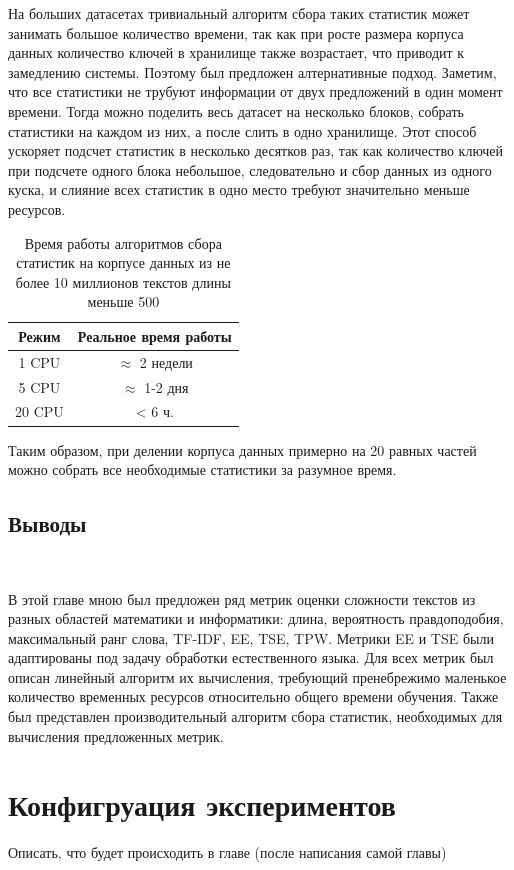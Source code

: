 \documentclass{spbau-diploma}
\begin{document}
На больших датасетах тривиальный алгоритм сбора таких статистик может занимать большое количество времени, так как при росте размера корпуса данных количество ключей в хранилище также возрастает, что приводит к замедлению системы. Поэтому был предложен алтернативные подход. Заметим, что все статистики не трубуют информации от двух предложений в один момент времени. Тогда можно поделить весь датасет на несколько блоков, собрать статистики на каждом из них, а после слить в одно хранилище. Этот способ ускоряет подсчет статистик в несколько десятков раз, так как количество ключей при подсчете одного блока небольшое, следовательно и сбор данных из одного куска, и слияние всех статистик в одно место требуют значительно меньше ресурсов.

\begin{table}[h]
	\label{table:collect_stats_time}
	\caption{Время работы алгоритмов сбора статистик на корпусе данных из не более 10 миллионов текстов длины меньше 500}
	\centering
	\begin{tabular}{|c|c|}
		\hline
		Режим & Реальное время работы \\
		\hline
		1 CPU & $\approx$ 2 недели \\
		5 CPU & $\approx$ 1-2 дня \\
		20 CPU & < 6 ч. \\
		\hline
	\end{tabular}
\end{table}

Таким образом, при делении корпуса данных примерно на 20 равных частей можно собрать все необходимые статистики за разумное время.
\pagebreak
\subsection{Выводы}
\ 

В этой главе мною был предложен ряд метрик оценки сложности текстов из разных областей математики и информатики: длина, вероятность правдоподобия, максимальный ранг слова, TF-IDF, EE, TSE, TPW. Метрики EE и TSE были адаптированы под задачу обработки естественного языка. Для всех метрик был описан линейный алгоритм их вычисления, требующий пренебрежимо маленькое количество временных ресурсов относительно общего времени обучения. Также был представлен производительный алгоритм сбора статистик, необходимых для вычисления предложенных метрик.

\section{Конфигруация экспериментов}
Описать, что будет происходить в главе (после написания самой главы)
\end{document}
